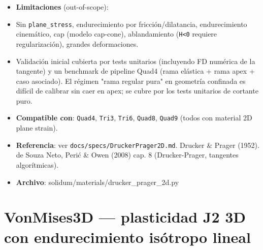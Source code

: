 \documentclass[11pt,letterpaper,oneside]{report}
\begin{document}
\begin{itemize}
  \item \textbf{Limitaciones} (out-of-scope):
  \item Sin \texttt{plane\_stress}, endurecimiento por fricción/dilatancia, endurecimiento cinemático, cap (modelo cap-cone), ablandamiento (\texttt{H<0} requiere regularización), grandes deformaciones.
  \item Validación inicial cubierta por tests unitarios (incluyendo FD numérica de la tangente) y un benchmark de pipeline Quad4 (rama elástica + rama apex + caso asociado). El régimen "rama regular pura" en geometría confinada es difícil de calibrar sin caer en apex; se cubre por los tests unitarios de cortante puro.
  \item \textbf{Compatible con}: \texttt{Quad4}, \texttt{Tri3}, \texttt{Tri6}, \texttt{Quad8}, \texttt{Quad9} (todos con material 2D plane strain).
  \item \textbf{Referencia}: ver \texttt{docs/specs/DruckerPrager2D.md}. Drucker \& Prager (1952). de Souza Neto, Perić \& Owen (2008) cap. 8 (Drucker-Prager, tangentes algorítmicas).
  \item \textbf{Archivo}: solidum/materials/drucker\_prager\_2d.py
\end{itemize}


\section{VonMises3D --- plasticidad J2 3D con endurecimiento isótropo lineal}
\end{document}
